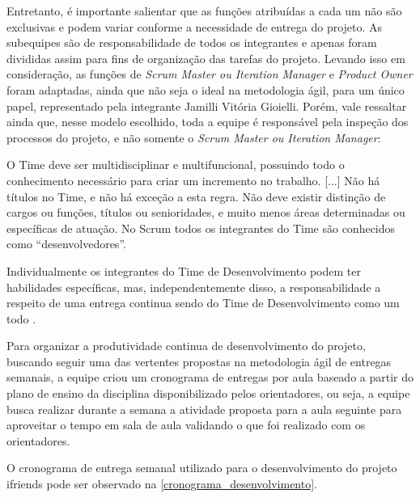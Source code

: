 Entretanto, é importante salientar que as funções atribuídas a cada um não são exclusivas e podem variar conforme a necessidade de entrega do projeto. As subequipes são de responsabilidade de todos os integrantes e apenas foram divididas assim para fins de organização das tarefas do projeto. Levando isso em consideração, as funções de \textsl{Scrum Master ou Iteration Manager} e \textsl{Product Owner} foram adaptadas, ainda que não seja o ideal na metodologia ágil, para um único papel, representado pela integrante Jamilli Vitória Gioielli. Porém, vale ressaltar ainda que, nesse modelo escolhido, toda a equipe é responsável pela inspeção dos processos do projeto, e não somente o \textsl{Scrum Master ou Iteration Manager}:

\begin{citacao}

O Time deve ser multidisciplinar e multifuncional, possuindo todo o conhecimento necessário para criar um incremento no trabalho. [...] Não há títulos no Time, e não há exceção a esta regra. Não deve existir distinção de cargos ou funções, títulos ou senioridades, e muito menos áreas determinadas ou específicas de atuação. No Scrum todos os integrantes do Time são conhecidos como “desenvolvedores”.

Individualmente os integrantes do Time de Desenvolvimento podem ter habilidades específicas, mas, independentemente disso, a responsabilidade a respeito de uma entrega continua sendo do Time de Desenvolvimento como um todo \cite{cruz:2018}.

\end{citacao}

Para organizar a produtividade continua de desenvolvimento do projeto, buscando seguir uma das vertentes propostas na metodologia ágil de entregas semanais, a equipe criou um cronograma de entregas por aula baseado a partir do plano de ensino da disciplina disponibilizado pelos orientadores, ou seja, a equipe busca realizar durante a semana a atividade proposta para a aula seguinte para aproveitar o tempo em sala de aula validando o que foi realizado com os orientadores. 

O cronograma de entrega semanal utilizado para o desenvolvimento do projeto \gls{ifriends} pode ser observado na \autoref{cronograma_desenvolvimento}.

